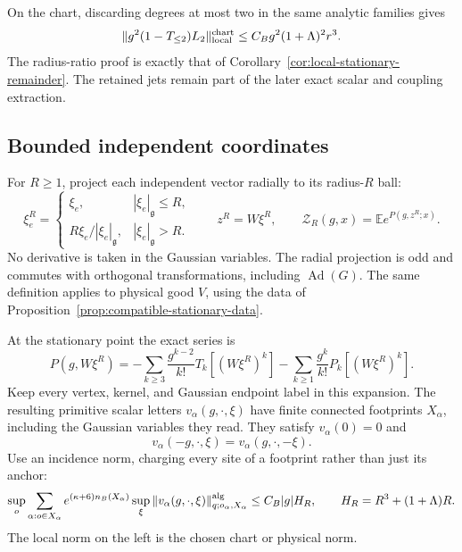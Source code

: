 \documentclass[11pt,reqno]{amsart}
\numberwithin{equation}{section}
\theoremstyle{definition}
\theoremstyle{remark}
\newcommand{\g}{\mathfrak g}
\begin{document}
On the chart, discarding degrees at most
two in the same analytic families gives
\begin{equation}
             \|g^2(1-T_{\le2})L_2\|_{\rm local}^{\rm chart}
                         \le C_Bg^2(1+\Lambda)^2r^3 .
 \label{eq:connected-L2-chart-subtraction}
\end{equation}
The radius-ratio proof is exactly that of
Corollary~\ref{cor:local-stationary-remainder}.
The retained jets remain part of the
later exact scalar and coupling extraction.

\subsection{Bounded independent coordinates}

For \(R\ge1\), project each independent vector
radially to its radius-\(R\) ball:
\[
 \xi_e^R=
 \begin{cases}
          \xi_e,&|\xi_e|_{\g}\le R,\\
          R\xi_e/|\xi_e|_{\g},&|\xi_e|_{\g}>R.
 \end{cases}
 \qquad
 z^R=W\xi^R,\qquad
 \mathcal Z_R(g,x)=\mathbb E e^{P(g,z^R;x)} .
\]
No derivative is taken in the Gaussian
variables. The radial projection is odd
and commutes with orthogonal transformations,
including \(\operatorname{Ad}(G)\).
The same definition applies to physical
good \(V\), using the data of
Proposition~\ref{prop:compatible-stationary-data}.

At the stationary point the exact series is
\begin{equation}
 P(g,W\xi^R)
   =-\sum_{k\ge3}\frac{g^{k-2}}{k!}T_k[(W\xi^R)^k]
     -\sum_{k\ge1}\frac{g^k}{k!}P_k[(W\xi^R)^k].
 \label{eq:connected-bounded-interaction-series}
\end{equation}
Keep every vertex, kernel, and Gaussian endpoint
label in this expansion.
The resulting primitive scalar letters
\(v_\alpha(g,\cdot,\xi)\) have finite connected
footprints \(X_\alpha\), including the Gaussian
variables they read.
They satisfy \(v_\alpha(0)=0\) and
\[
             v_\alpha(-g,\cdot,\xi)
                         =v_\alpha(g,\cdot,-\xi).
\]
Use an incidence norm, charging every site
of a footprint rather than just its anchor:
\begin{equation}
 \sup_o\sum_{\alpha:o\in X_\alpha}
       e^{(\kappa+6)n_B(X_\alpha)}
            \sup_\xi\|v_\alpha(g,\cdot,\xi)\|^{\rm alg}_{q;o_\alpha,X_\alpha}
                   \le C_B|g|H_R,\qquad
                 H_R=R^3+(1+\Lambda)R .
 \label{eq:connected-primitive-incidence}
\end{equation}
The local norm on the left is the chosen
chart or physical norm.
\end{document}
